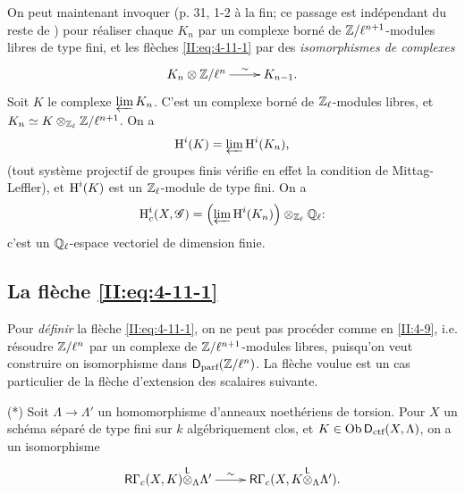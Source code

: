 \documentclass[oneside]{book}
\begin{document}
On peut maintenant invoquer \cite[XI.3.3]{SGA5} (p. 31, 1-2 \`a la fin; ce 
passage est ind\'ependant du reste de \cite{SGA5}) pour r\'ealiser chaque 
$K_n$ par un complexe born\'e de $\mathbb{Z}/\ell^{n+1}$-modules libres de type fini, 
et les fl\`eches \eqref{II:eq:4-11-1} par des \emph{isomorphismes de complexes} 
\[\xymatrix{
  K_n\otimes \dZ/\ell^n \ar[r]^-\sim 
    & K_{n-1} \text{.}
}\]
Soit $K$ le complexe $\varprojlim K_n$. C'est un complexe born\'e de 
$\mathbb{Z}_\ell$-modules libres, et $K_n\simeq K\otimes_{\mathbb{Z}_\ell}\mathbb{Z}/\ell^{n+1}$. On 
a 
\[
  \operatorname{H}^i(K) = \varprojlim \operatorname{H}^i(K_n) \text{,}
\]
(tout syst\`eme projectif de groupes finis v\'erifie en effet la condition de 
Mittag-Leffler), et $\operatorname{H}^i(K)$ est un $\mathbb{Z}_\ell$-module de type fini. On a 
\[
  \operatorname{H}_c^i(X,\mathscr{G}) = \left(\varprojlim \operatorname{H}^i(K_n) \right)\otimes_{\mathbb{Z}_\ell} \mathbb{Q}_\ell \text{:}
\]
c'est un $\mathbb{Q}_\ell$-espace vectoriel de dimension finie. 





\subsection{La fl\`eche \texorpdfstring{\eqref{II:eq:4-11-1}}{(4.11.1)}}\label{II:4-12}

Pour \emph{d\'efinir} la fl\`eche \eqref{II:eq:4-11-1}, on ne peut pas 
proc\'eder comme en \ref{II:4-9}, i.e. r\'esoudre $\mathbb{Z}/\ell^n$ par un complexe 
de $\mathbb{Z}/\ell^{n+1}$-modules libres, puisqu'on veut construire on isomorphisme 
dans $\mathsf{D}_\text{parf}(\mathbb{Z}/\ell^n)$. La fl\`eche voulue est un cas particulier de 
la fl\`eche d'extension des scalaires suivante. 

(*) Soit $\Lambda\to\Lambda'$ un homomorphisme d'anneaux noeth\'eriens de 
torsion. Pour $X$ un sch\'ema s\'epar\'e de type fini sur $k$ alg\'ebriquement 
clos, et $K\in\operatorname{Ob}\mathsf{D}_\text{ctf}(X,\Lambda)$, on a un isomorphisme 
\[\xymatrix{
  \R\Gamma_c(X,K)\lotimes_\Lambda \Lambda' \ar[r]^-\sim & \R \Gamma_c(X,K\lotimes_\Lambda \Lambda') \text{.}
}\]
\end{document}
